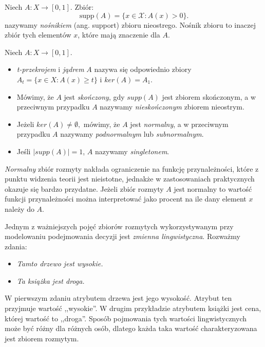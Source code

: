 \begin{definition} Niech $A : X \rightarrow [0,1].$ Zbiór:
\begin{equation}
  \mathrm{supp}(A) = \{ x \in \mathcal{X} : A(x) > 0 \}.
\end{equation}
nazywamy \emph{nośnikiem} (ang. support) zbioru nieostrego.
Nośnik zbioru to inaczej zbiór tych elementów $x$, które mają znaczenie dla $A$.  
\end{definition}

\begin{definition}
Niech $A : X \rightarrow [0,1]$.
\begin{itemize}
  \item \emph{t-przekrojem} i \emph{jądrem} $A$ nazywa się odpowiednio zbiory
  \newline $A_t = \{ x \in X : A(x) \geq t \}$ i $ker(A) = A_1$.
  \item Mówimy, że $A$ jest \emph{skończony}, gdy $supp(A)$ jest zbiorem
  skończonym, a w przeciwnym przypadku $A$ nazywamy \emph{nieskończonym} zbiorem
  nieostrym.
  \item Jeżeli $ker(A) \neq \emptyset,$ mówimy, że $A$ jest \emph{normalny}, a w
  przeciwnym przypadku $A$ nazywamy \emph{podnormalnym} lub \emph{subnormalnym}.
  \item Jeśli $|supp(A)| = 1$, $A$ nazywamy \emph{singletonem}.
\end{itemize}
\end{definition}

\emph{Normalny} zbiór rozmyty nakłada ograniczenie na funkcję przynależności,
które z punktu widzenia teorii jest nieistotne, jednakże w zastosowaniach
praktycznych okazuje się bardzo przydatne. Jeżeli zbiór rozmyty $A$ jest
normalny to wartość funkcji przynależności można interpretować jako procent na
ile dany element $x$ należy do $A$.

Jednym z ważniejszych pojęć zbiorów rozmytych wykorzystywanym przy modelowaniu
podejmowania decyzji jest \emph{zmienna lingwistyczna}. Rozważmy zdania:
\begin{itemize}
  \item[] \emph{Tamto drzewo jest wysokie.}
  \item[] \emph{Ta książka jest droga.}
\end{itemize}

W pierwszym zdaniu atrybutem drzewa jest jego wysokość. Atrybut ten przyjmuje
wartość ,,wysokie''. W drugim przykładzie atrybutem książki jest cena, której
wartość to ,,droga''. Sposób pojmowania tych wartości lingwistycznych może być
różny dla różnych osób, dlatego każda taka wartość charakteryzowana jest zbiorem
rozmytym.

